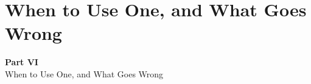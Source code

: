 \documentclass[aspectratio=169,11pt]{beamer}
\begin{document}

\section{When to Use One, and What Goes Wrong}

\begin{frame}{}
\vfill
\begin{center}
{\Huge \textcolor{uzhblue}{\textbf{Part VI}}}\\[12pt]
{\LARGE When to Use One, and What Goes Wrong}
\end{center}
\vfill
\end{frame}
\end{document}
